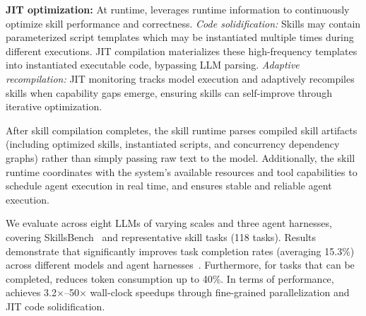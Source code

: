 \textbf{JIT optimization:} At runtime, \sys leverages runtime information to continuously optimize skill performance and correctness. 
\emph{Code solidification:} Skills may contain parameterized script templates which may be instantiated multiple times during different executions. 
JIT compilation materializes these high-frequency templates into instantiated executable code, bypassing LLM parsing. 
\emph{Adaptive recompilation:} JIT monitoring tracks model execution and adaptively recompiles skills when
capability gaps emerge, ensuring skills can self-improve through iterative optimization.

After skill compilation completes, the skill runtime parses compiled skill artifacts (including optimized
skills, instantiated scripts, and concurrency dependency graphs) rather than
simply passing raw text to the model. Additionally, the skill
runtime coordinates with the system's available resources and tool capabilities
to schedule agent execution in real time, and ensures stable and reliable agent execution.

We evaluate \sys across eight LLMs of varying scales and three agent harnesses, covering SkillsBench~\cite{li2026skillsbench} and representative skill tasks (118 tasks).
Results demonstrate that \sys significantly improves task completion rates (averaging 15.3\%) across different models and agent harnesses~\cite{claudecode,opencode}.
Furthermore, for tasks that can be completed, \sys reduces token consumption up to 40\%.
In terms of performance, \sys achieves 3.2$\times$--50$\times$ wall-clock speedups through fine-grained parallelization and JIT code solidification.
